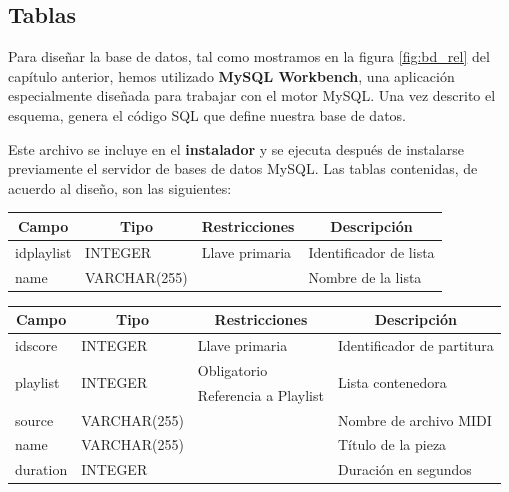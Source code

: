 \subsection{Tablas}

Para diseñar la base de datos, tal como mostramos en la figura \ref{fig:bd_rel} del capítulo anterior, hemos utilizado \textbf{MySQL Workbench}, una aplicación especialmente diseñada para trabajar con el motor MySQL. Una vez descrito el esquema, genera el código \acrshort{SQL} que define nuestra base de datos.

Este archivo se incluye en el \textbf{instalador} y se ejecuta después de instalarse previamente el servidor de bases de datos MySQL. Las tablas contenidas, de acuerdo al diseño, son las siguientes:

\smallskip

\begin{center}
	\begin{tabular}{|l|l|l|l|}
		\hline \multicolumn{1}{|c|}{\textbf{Campo}} & \multicolumn{1}{c|}{\textbf{Tipo}} & \multicolumn{1}{c|}{\textbf{Restricciones}} & \multicolumn{1}{c|}{\textbf{Descripción}} \\ 
		\hline idplaylist & INTEGER & Llave primaria & Identificador de lista \\ 
		\hline name & VARCHAR(255) & & Nombre de la lista \\ 
		\hline 
	\end{tabular}
	\smallskip
\end{center}

\smallskip

\smallskip

\begin{center}
	\begin{tabular}{|l|l|l|l|}
		\hline \multicolumn{1}{|c|}{\textbf{Campo}} & \multicolumn{1}{c|}{\textbf{Tipo}} & \multicolumn{1}{c|}{\textbf{Restricciones}} & \multicolumn{1}{c|}{\textbf{Descripción}} \\
		\hline idscore & INTEGER & Llave primaria & Identificador de partitura \\ 
		\hline \multirow{2}{*}{playlist} & \multirow{2}{*}{INTEGER} & Obligatorio & \multirow{2}{*}{Lista contenedora} \\
		\cline{3-3} & & Referencia a Playlist & \\
		\hline source & VARCHAR(255) & & Nombre de archivo MIDI \\
		\hline name & VARCHAR(255) & & Título de la pieza \\
		\hline duration & INTEGER & & Duración en segundos \\
		\hline 
	\end{tabular}
	\smallskip
\end{center}

